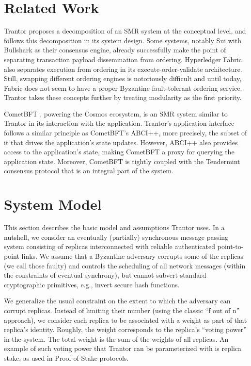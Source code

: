 \documentclass{article}
\begin{document}
\section{Related Work}
\label{sec:related-work}

Trantor proposes a decomposition of an SMR system at the conceptual level,
and follows this decomposition in its system design.
Some systems, notably Sui \cite{sui} with Bullshark \cite{bullshark} as their consensus engine,
already successfully make the point of separating transaction payload dissemination from ordering.
Hyperledger Fabric \cite{fabric} also separates execution from ordering in its execute-order-validate architecture.
Still, swapping different ordering engines is notoriously difficult and until today,
Fabric does not seem to have a proper Byzantine fault-tolerant ordering service.
Trantor takes these concepts further by treating modularity as the first priority.

CometBFT \cite{comet}, powering the Cosmos ecosystem, is an SMR system similar to Trantor in its interaction with the application.
Trantor's application interface follows a similar principle as CometBFT’s ABCI++,
more precisely, the subset of it that drives the application’s state updates.
However, ABCI++ also provides access to the application’s state, making CometBFT a proxy for querying the application state.
Moreover, CometBFT is tightly coupled with the Tendermint consensus protocol that is an integral part of the system.

\section{System Model}
\label{sec:system-model}

This section describes the basic model and assumptions Trantor uses.
In a nutshell, we consider an eventually (partially) synchronous message passing system
consisting of replicas interconnected with reliable authenticated point-to-point links.
We assume that a Byzantine adversary corrupts some of the replicas (we call those faulty)
and controls the scheduling of all network messages (within the constraints of eventual synchrony),
but cannot subvert standard cryptographic primitives, e.g., invert secure hash functions.

We generalize the usual constraint on the extent to which the adversary can corrupt replicas.
Instead of limiting their number (using the classic “f out of n” approach),
we consider each replica to be associated with a weight as part of that replica’s identity.
Roughly, the weight corresponds to the replica’s “voting power” in the system.
The total weight is the sum of the weights of all replicas.
An example of such voting power that Trantor can be parameterized with is replica stake,
as used in Proof-of-Stake protocols. 
\end{document}
